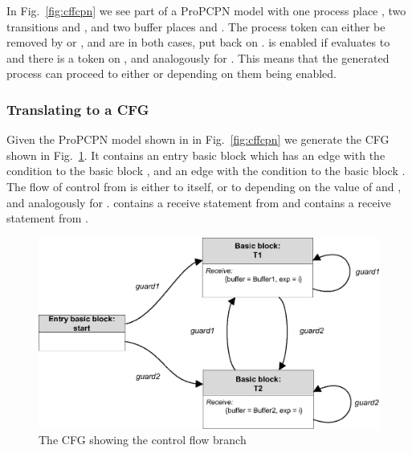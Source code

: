 In Fig.~\ref{fig:cffcpn} we see part of a ProPCPN model with one process place , two transitions  and , and two buffer places  and . The process token can either be removed by  or , and are in both cases, put back on .  is enabled if  evaluates to  and there is a token on , and analogously for . This means that the generated process can proceed to either  or  depending on them being enabled.

\subsubsection{Translating to a CFG} 

Given the ProPCPN model shown in in Fig.~\ref{fig:cffcpn} we generate the CFG shown in Fig.~\ref{fig:cffcfg}. It contains an entry basic block  which has an edge with the condition  to the basic block , and an edge with the condition  to the basic block .
The flow of control from  is either to itself, or to  depending on the value of  and , and analogously for .  contains a receive statement from  and  contains a receive statement from . 

\begin{figure}
\centering
\includegraphics[scale=0.5]{translation/advancedissues/graphics/cffcfg.eps}
\caption{The CFG showing the control flow branch}
\label{fig:cffcfg}
\end{figure}

